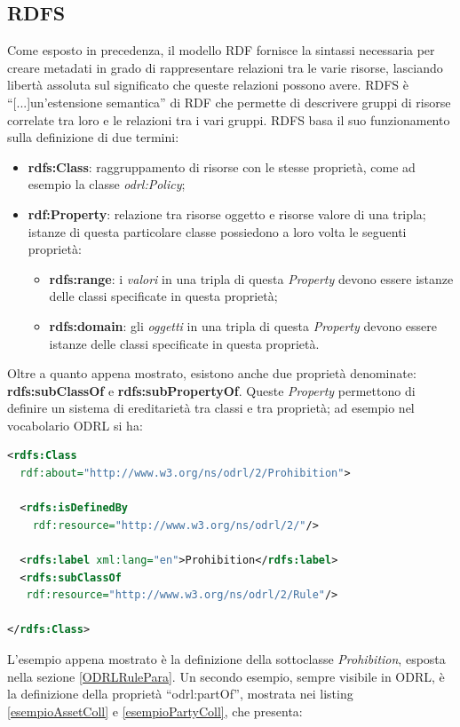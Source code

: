 \documentclass[12pt,a4paper,twoside]{book}
\begin{document}
\subsection{RDFS}
Come esposto in precedenza, il modello RDF fornisce la sintassi necessaria per creare metadati in grado di rappresentare relazioni tra le varie risorse, lasciando libertà assoluta sul significato che queste relazioni possono avere. RDFS è ``[...]un'estensione semantica''\cite{RDFS} di RDF che permette di descrivere gruppi di risorse correlate tra loro e le relazioni tra i vari gruppi. RDFS basa il suo funzionamento sulla definizione di due termini:
\begin{itemize}
\item \textbf{rdfs:Class}: raggruppamento di risorse con le stesse proprietà, come ad esempio la classe \textit{odrl:Policy};
\item \textbf{rdf:Property}: relazione tra risorse oggetto e risorse valore di una tripla; istanze di questa particolare classe possiedono a loro volta le seguenti proprietà:
\begin{itemize}
\item \textbf{rdfs:range}: i \textit{valori} in una tripla di questa \textit{Property} devono essere istanze delle classi specificate in questa proprietà;  
\item \textbf{rdfs:domain}: gli \textit{oggetti} in una tripla di questa \textit{Property} devono essere istanze delle classi specificate in questa proprietà.
\end{itemize}
\end{itemize}
\newpage
Oltre a quanto appena mostrato, esistono anche due proprietà denominate: \textbf{rdfs:subClassOf} e \textbf{rdfs:subPropertyOf}. Queste \textit{Property} permettono di definire un sistema di ereditarietà tra classi e tra proprietà; ad esempio nel vocabolario ODRL si ha:\\
\begin{lstlisting}[language=xml,firstnumber=1,caption={Estratto vocabolario ODRL\cite{ODRVocab}},captionpos=b,label=vocabExtract]
<rdfs:Class 
  rdf:about="http://www.w3.org/ns/odrl/2/Prohibition">
  
  <rdfs:isDefinedBy 
    rdf:resource="http://www.w3.org/ns/odrl/2/"/>
  
  <rdfs:label xml:lang="en">Prohibition</rdfs:label>
  <rdfs:subClassOf
   rdf:resource="http://www.w3.org/ns/odrl/2/Rule"/>
  
</rdfs:Class>
  \end{lstlisting}
L'esempio appena mostrato è la definizione della sottoclasse \textit{Prohibition}, esposta nella sezione \ref{ODRLRulePara}. Un secondo esempio, sempre visibile in ODRL, è la definizione della proprietà ``odrl:partOf'', mostrata nei listing \ref{esempioAssetColl} e \ref{esempioPartyColl}, che presenta:
\end{document}
